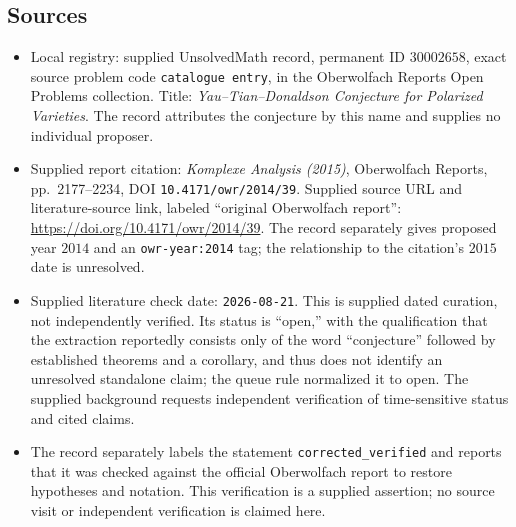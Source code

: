 \documentclass[11pt]{article}
\begin{document}
\subsection{Sources}
\begin{itemize}
\item Local registry: supplied UnsolvedMath record, permanent ID \(30002658\), exact source problem code \texttt{catalogue entry}, in the Oberwolfach Reports Open Problems collection. Title: \emph{Yau--Tian--Donaldson Conjecture for Polarized Varieties}. The record attributes the conjecture by this name and supplies no individual proposer.
\item Supplied report citation: \emph{Komplexe Analysis (2015)}, Oberwolfach Reports, pp.~2177--2234, DOI \texttt{10.4171/owr/2014/39}. Supplied source URL and literature-source link, labeled ``original Oberwolfach report'': \url{https://doi.org/10.4171/owr/2014/39}. The record separately gives proposed year \(2014\) and an \texttt{owr-year:2014} tag; the relationship to the citation's \(2015\) date is unresolved.
\item Supplied literature check date: \texttt{2026-08-21}. This is supplied dated curation, not independently verified. Its status is ``open,'' with the qualification that the extraction reportedly consists only of the word ``conjecture'' followed by established theorems and a corollary, and thus does not identify an unresolved standalone claim; the queue rule normalized it to open. The supplied background requests independent verification of time-sensitive status and cited claims.
\item The record separately labels the statement \texttt{corrected\_verified} and reports that it was checked against the official Oberwolfach report to restore hypotheses and notation. This verification is a supplied assertion; no source visit or independent verification is claimed here.
\end{itemize}
\end{document}
